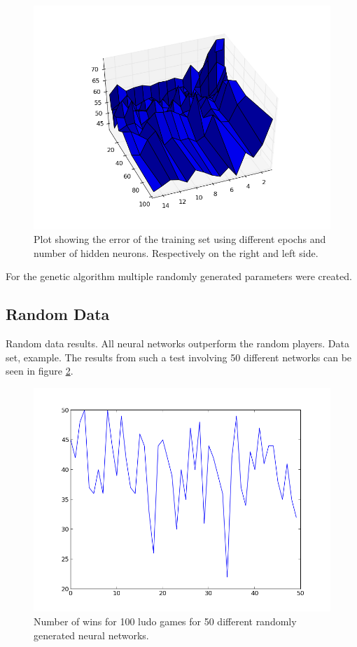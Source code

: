 \documentclass{llncs}
\begin{document}
\begin{figure}[t]
        \centering
		\includegraphics[scale=0.3]{../testing_fit_3D.png} 
        \caption{ Plot showing the error of the training set using different epochs and number of hidden neurons. Respectively on the right and left side.}\label{fig:3D}
\end{figure} 


For the genetic algorithm multiple randomly generated parameters were created.

\subsection*{Random Data}

Random data results. All neural networks outperform the random players. Data set, example.
The results from such a test involving 50 different networks can be seen in figure \ref{fig:random_50}.

\begin{figure}[t]
        \centering
		\includegraphics[scale=0.3]{../50_random_1.png} 
        \caption{ Number of wins for 100 ludo games for 50 different randomly generated neural networks. }\label{fig:random_50}
\end{figure} 
\end{document}
